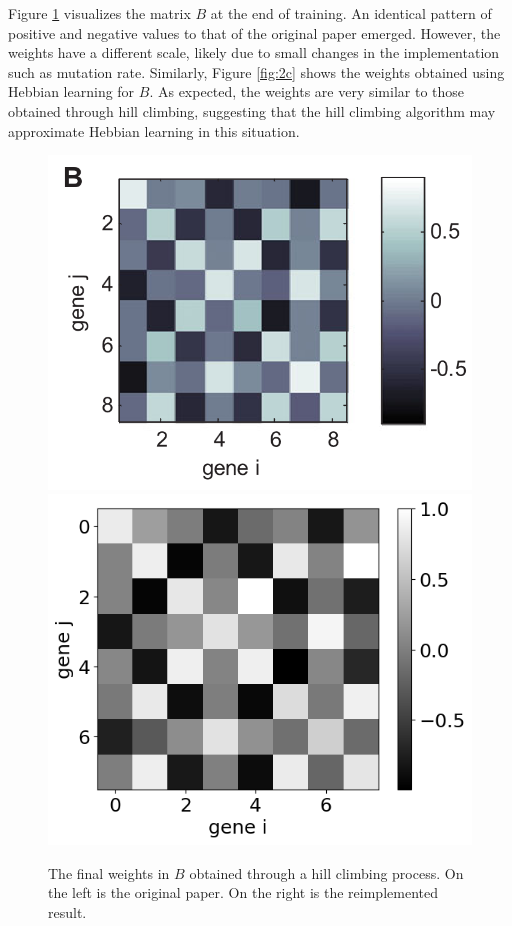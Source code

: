 \documentclass[twocolumn,a4paper,11pt]{article}
\begin{document}
    Figure \ref{fig:2b} visualizes the matrix $B$ at the end of training. An identical pattern of positive and negative values to that of the original paper emerged. However, the weights have a different scale, likely due to small changes in the implementation such as mutation rate. Similarly, Figure \ref{fig:2c} shows the weights obtained using Hebbian learning for $B$. As expected, the weights are very similar to those obtained through hill climbing, suggesting that the hill climbing algorithm may approximate Hebbian learning in this situation.

    \begin{figure}[h]
        \centering
        \includegraphics[width=0.48\linewidth]{orig_img/fig2b.png}
        \includegraphics[width=0.48\linewidth]{img/fig2b.png}
        \caption{The final weights in $B$ obtained through a hill climbing process. On the left is the original paper. On the right is the reimplemented result.} \label{fig:2b}
    \end{figure}
\end{document}
